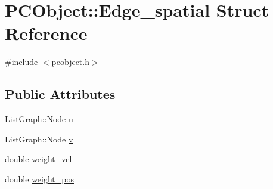\hypertarget{struct_p_c_object_1_1_edge__spatial}{\section{\-P\-C\-Object\-:\-:\-Edge\-\_\-spatial \-Struct \-Reference}
\label{struct_p_c_object_1_1_edge__spatial}
}


{\ttfamily \#include $<$pcobject.\-h$>$}

\subsection*{\-Public \-Attributes}
\begin{DoxyCompactItemize}
\item 
\-List\-Graph\-::\-Node \hyperlink{struct_p_c_object_1_1_edge__spatial_a2d9774f6ad421e7852dee873d267b420}{u}
\item 
\-List\-Graph\-::\-Node \hyperlink{struct_p_c_object_1_1_edge__spatial_ac395ba6d91a7054ea23ad9d5711a44f5}{v}
\item 
double \hyperlink{struct_p_c_object_1_1_edge__spatial_a9c3350fad42237e5eb7cc13f0509a0ce}{weight\-\_\-vel}
\item 
double \hyperlink{struct_p_c_object_1_1_edge__spatial_a1bb24b8152a4c3310f933c041fec1a48}{weight\-\_\-pos}
\end{DoxyCompactItemize}


